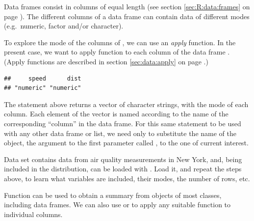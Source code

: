 \documentclass[krantz2]{krantz}\usepackage{knitr}%
\begin{document}
Data frames consist in columns of equal length (see section \ref{sec:R:data:frames} on page \pageref{sec:R:data:frames}). The different columns of a data frame can contain data of different modes (e.g.\ numeric, factor and/or character).

To explore the mode of the columns of , we can use an \emph{apply} function. In the present case, we want to apply function  to each column of the data frame . (Apply functions are described in section \ref{sec:data:apply} on page \pageref{sec:data:apply}.)

\begin{knitrout}\footnotesize
{}\color{fgcolor}\begin{kframe}
\begin{alltt}
\hlstd{(}   
\end{alltt}
\begin{verbatim}
##     speed      dist 
## "numeric" "numeric"
\end{verbatim}
\end{kframe}
\end{knitrout}

The statement above returns a vector of character strings, with the mode of each column. Each element of the vector is named according to the name of the corresponding ``column'' in the data frame. For this same statement to be used with any other data frame or list, we need only to substitute the name of the object, the argument to the first parameter called , to the one of current interest.

\begin{playground}
Data set  contains data from air quality measurements in New York, and, being included in the \Rpgrm distribution, can be loaded with . Load it, and repeat the steps above, to learn what variables are included, their modes, the number of rows, etc.
\end{playground}

Function  can be used to obtain a summary from objects of most \Rlang classes, including data frames. We can also use  or  to apply any suitable function to individual columns.
\end{document}
